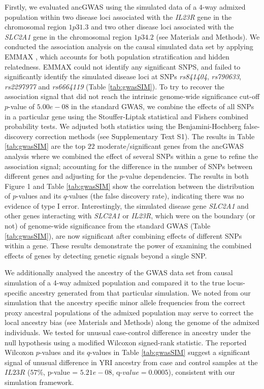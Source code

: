 \documentclass[10pt]{article}
\begin{document}
Firstly, we evaluated ancGWAS using the simulated data of a $4$-way admixed population within two disease loci associated with the \textit{IL23R} gene in the chromosomal region $1p31.3$ and two other disease loci associated with the \textit{SLC2A1} gene in the chromosomal region $1p34.2$ (see Materials and Methods). We conducted the association analysis on the causal simulated data set by applying EMMAX \cite{emax1}, which accounts for both population stratification and hidden relatedness. EMMAX could not identify any significant SNPS, and failed to significantly identify the simulated disease loci at SNPs \textit{rs841404}, \textit{rs790633}, \textit{rs2297977} and \textit{rs6664119} (Table \ref{tab:gwasSIM}). To try to recover the association signal that did not reach the intrinsic genome-wide significance cut-off $p$-value of $ 5.00e-08$ in the standard GWAS, we combine the effects of all SNPs in a particular gene using the Stouffer-Liptak statistical and Fishers combined probability tests. We adjusted both statistics using the Benjamini-Hochberg \cite{benj} false-discovery correction methods (see Supplementary Text S1). The results in Table \ref{tab:gwasSIM} are the top $22$ moderate/significant genes from the ancGWAS analysis where we combined the effect of several SNPs within a gene to refine the association signal; accounting for the difference in the number of SNPs between different genes \cite{sizeg} and adjusting for the $p$-value dependencies. The results in both Figure 1 and Table \ref{tab:gwasSIM} show the correlation between the distribution of $p$-values and its $q$-values (the false discovery rate), indicating there was no evidence of type I error. Interestingly, the simulated disease gene \textit{SLC2A1} and other genes interacting with \textit{SLC2A1} or \textit{IL23R}, which were on the boundary (or not) of genome-wide significance from the standard GWAS (Table \ref{tab:gwasSIM}), are now significant after combining effects of different SNPs within a gene. These results demonstrate the power of examining the combined effects of genes by detecting genetic signals beyond a single SNP. 

We additionally analysed the ancestry of the GWAS data set from causal simulation of a 4-way admixed population and compared it to the true locus-specific ancestry generated from that particular simulation. We noted from our simulation that the ancestry specific minor allele frequencies from the correct proxy ancestral populations \cite{gala,chims1} of the admixed population may serve to correct the local ancestry bias (see Materials and Methods) along the genome of the admixed individuals. We tested for unusual case-control difference in ancestry under the null hypothesis using a modified Wilcoxon signed-rank statistic. The reported Wilcoxon $p$-values and its $q$-values in Table \ref{tab:gwasSIM} suggest a significant signal of unusual difference in YRI ancestry from case and control samples at the $\textit{IL23R}$ ($57\%$, p-value = $5.21e-08$, q-$value=0.0005$), consistent with our simulation framework. 
\end{document}
